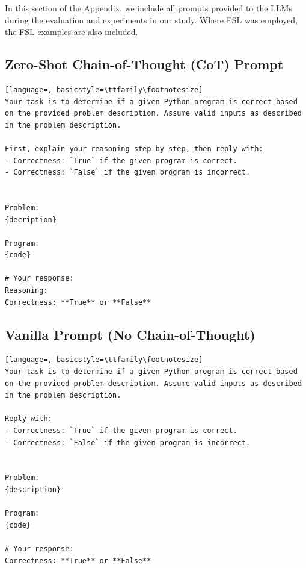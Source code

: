 \documentclass[sigconf]{acmart}
\begin{document}
In this section of the Appendix, we include all prompts provided to the LLMs during the evaluation and experiments in our study. Where FSL was employed, the FSL examples are also included.

\subsection{Zero-Shot Chain-of-Thought (CoT) Prompt}
\label{0-shot-COT-prompt}
\begin{tcolorbox}[ colback=gray!10, colframe=black, arc=5pt]
\begin{lstlisting}[language=, basicstyle=\ttfamily\footnotesize]
Your task is to determine if a given Python program is correct based on the provided problem description. Assume valid inputs as described in the problem description.

First, explain your reasoning step by step, then reply with:  
- Correctness: `True` if the given program is correct.  
- Correctness: `False` if the given program is incorrect.


Problem:  
{decription}

Program:  
{code}

# Your response:  
Reasoning:
Correctness: **True** or **False**

\end{lstlisting}
\end{tcolorbox}


\subsection{Vanilla Prompt (No Chain-of-Thought)}
\label{vanilla-prompt}
\begin{tcolorbox}[ colback=gray!10, colframe=black, arc=5pt]
\begin{lstlisting}[language=, basicstyle=\ttfamily\footnotesize]
Your task is to determine if a given Python program is correct based on the provided problem description. Assume valid inputs as described in the problem description.

Reply with:  
- Correctness: `True` if the given program is correct.  
- Correctness: `False` if the given program is incorrect.


Problem:  
{description}

Program:  
{code}

# Your response:  
Correctness: **True** or **False**

\end{lstlisting}
\end{tcolorbox}
\end{document}
